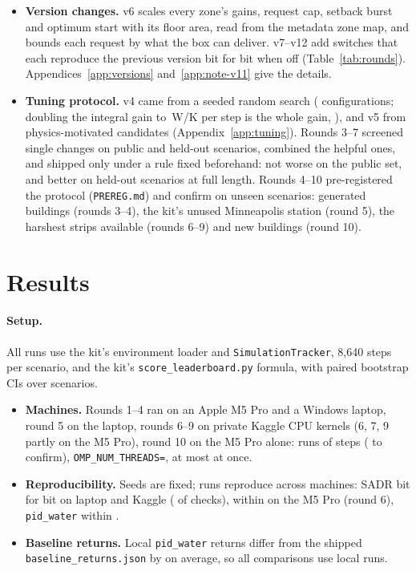 \documentclass{article}
\begin{document}
\begin{itemize}
\begin{itemize}
  \end{itemize}
\item \textbf{Version changes.} v6 scales every zone's gains, request cap, setback burst and optimum start with its floor area, read from the metadata zone map, and bounds each request by what the box can deliver. v7--v12 add switches that each reproduce the previous version bit for bit when off (Table~\ref{tab:rounds}). Appendices~\ref{app:versions} and~\ref{app:note-v11} give the details.
\item \textbf{Tuning protocol.} v4 came from a seeded random search (\NTuneConfigs{} configurations; doubling the integral gain to \ParKiWPerKStep\,W/K per step is the whole gain, \AblRelDefAddKi), and v5 from \NCandV{} physics-motivated candidates (Appendix~\ref{app:tuning}). Rounds 3--7 screened single changes on public and held-out scenarios, combined the helpful ones, and shipped only under a rule fixed beforehand: not worse on the public set, and better on held-out scenarios at full length. Rounds 4--10 pre-registered the protocol (\texttt{PREREG.md}) and confirm on unseen scenarios: generated buildings (rounds 3--4), the kit's unused Minneapolis station (round 5), the harshest strips available (rounds 6--9) and new buildings (round 10).
\end{itemize}

\section{Results}
\label{sec:results}

\paragraph{Setup.} All runs use the kit's environment loader and \texttt{SimulationTracker}, 8,640 steps per scenario, and the kit's \texttt{score\_leaderboard.py} formula, with paired bootstrap CIs over scenarios.
\begin{itemize}
\item \textbf{Machines.} Rounds 1--4 ran on an Apple M5 Pro and a Windows laptop, round 5 on the laptop, rounds 6--9 on private Kaggle CPU kernels (6, 7, 9 partly on the M5 Pro), round 10 on the M5 Pro alone: \RTenMacRuns{} runs of \RTenSteps{} steps (\RTenMacConfRuns{} to confirm), \texttt{OMP\_NUM\_THREADS=\RTenOmpThreads}, at most \RTenMacWorkersMax{} at once.
\item \textbf{Reproducibility.} Seeds are fixed; runs reproduce across machines: SADR bit for bit on laptop and Kaggle (\RSixReproIdentical{} of \RSixReproN{} checks), within \RSixMacReproMaxRel{} on the M5 Pro (round 6), \texttt{pid\_water} within \MachineGapPidWater.
\item \textbf{Baseline returns.} Local \texttt{pid\_water} returns differ from the shipped \texttt{baseline\_returns.json} by \GapMeanPidWater{} on average, so all comparisons use local runs.
\end{itemize}
\end{document}

